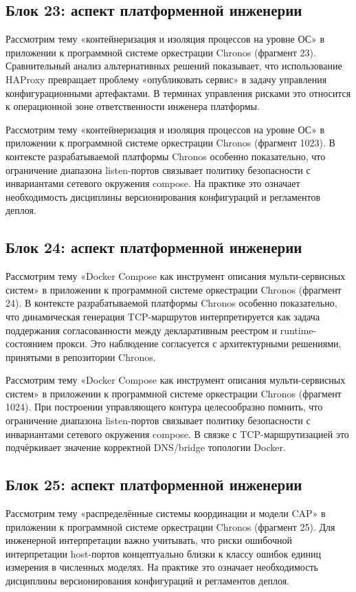\subsection{Блок 23: аспект платформенной инженерии}
 Рассмотрим тему «контейнеризация и изоляция процессов на уровне ОС» в приложении к программной системе оркестрации Chronos (фрагмент 23). Сравнительный анализ альтернативных решений показывает, что использование HAProxy превращает проблему «опубликовать сервис» в задачу управления конфигурационными артефактами. В терминах управления рисками это относится к операционной зоне ответственности инженера платформы.

 Рассмотрим тему «контейнеризация и изоляция процессов на уровне ОС» в приложении к программной системе оркестрации Chronos (фрагмент 1023). В контексте разрабатываемой платформы Chronos особенно показательно, что ограничение диапазона listen-портов связывает политику безопасности с инвариантами сетевого окружения compose. На практике это означает необходимость дисциплины версионирования конфигураций и регламентов деплоя.

\subsection{Блок 24: аспект платформенной инженерии}
 Рассмотрим тему «Docker Compose как инструмент описания мульти-сервисных систем» в приложении к программной системе оркестрации Chronos (фрагмент 24). В контексте разрабатываемой платформы Chronos особенно показательно, что динамическая генерация TCP-маршрутов интерпретируется как задача поддержания согласованности между декларативным реестром и runtime-состоянием прокси. Это наблюдение согласуется с архитектурными решениями, принятыми в репозитории Chronos.

 Рассмотрим тему «Docker Compose как инструмент описания мульти-сервисных систем» в приложении к программной системе оркестрации Chronos (фрагмент 1024). При построении управляющего контура целесообразно помнить, что ограничение диапазона listen-портов связывает политику безопасности с инвариантами сетевого окружения compose. В связке с TCP-маршрутизацией это подчёркивает значение корректной DNS/bridge топологии Docker.

\subsection{Блок 25: аспект платформенной инженерии}
 Рассмотрим тему «распределённые системы координации и модели CAP» в приложении к программной системе оркестрации Chronos (фрагмент 25). Для инженерной интерпретации важно учитывать, что риски ошибочной интерпретации host-портов концептуально близки к классу ошибок единиц измерения в численных моделях. На практике это означает необходимость дисциплины версионирования конфигураций и регламентов деплоя.

